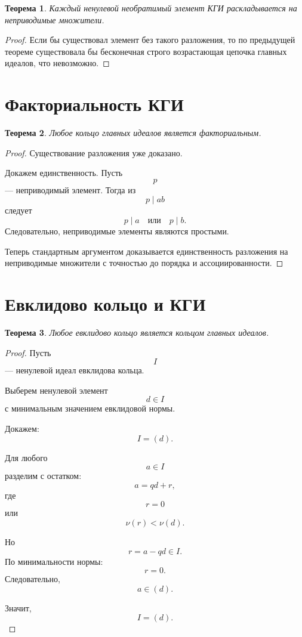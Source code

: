 \documentclass[12pt, a4paper]{article}
\newtheorem{theorem}{Теорема}
\theoremstyle{definition}
\theoremstyle{remark}
\begin{document}
\begin{theorem}
	Каждый ненулевой необратимый элемент КГИ раскладывается на неприводимые
	множители.
\end{theorem}

\begin{proof}
	Если бы существовал элемент без такого разложения, то по предыдущей теореме
	существовала бы бесконечная строго возрастающая цепочка главных идеалов,
	что невозможно.
\end{proof}

\section{Факториальность КГИ}

\begin{theorem}
	Любое кольцо главных идеалов является факториальным.
\end{theorem}

\begin{proof}
	Существование разложения уже доказано.
	
	Докажем единственность. Пусть
	\[
	p
	\]
	--- неприводимый элемент. Тогда из
	\[
	p\mid ab
	\]
	следует
	\[
	p\mid a
	\quad \text{или}\quad
	p\mid b.
	\]
	Следовательно, неприводимые элементы являются простыми.
	
	Теперь стандартным аргументом доказывается единственность разложения на
	неприводимые множители с точностью до порядка и ассоциированности.
\end{proof}

\section{Евклидово кольцо и КГИ}

\begin{theorem}
	Любое евклидово кольцо является кольцом главных идеалов.
\end{theorem}

\begin{proof}
	Пусть
	\[
	I
	\]
	--- ненулевой идеал евклидова кольца.
	
	Выберем ненулевой элемент
	\[
	d\in I
	\]
	с минимальным значением евклидовой нормы.
	
	Докажем:
	\[
	I=(d).
	\]
	
	Для любого
	\[
	a\in I
	\]
	разделим с остатком:
	\[
	a=qd+r,
	\]
	где
	\[
	r=0
	\]
	или
	\[
	\nu(r)<\nu(d).
	\]
	
	Но
	\[
	r=a-qd\in I.
	\]
	По минимальности нормы:
	\[
	r=0.
	\]
	Следовательно,
	\[
	a\in(d).
	\]
	
	Значит,
	\[
	I=(d).
	\]
\end{proof}
\end{document}

